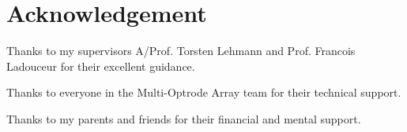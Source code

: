 \chapter{Acknowledgement}

Thanks to my supervisors A/Prof. Torsten Lehmann and Prof. Francois Ladouceur for their excellent guidance.

Thanks to everyone in the Multi-Optrode Array team for their technical support.

Thanks to my parents and friends for their financial and mental support.
